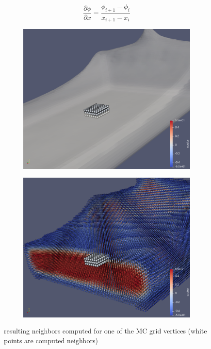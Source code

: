 \begin{equation}
	\dfrac{\partial \phi}{\partial x} = \dfrac{\phi_{i+1} - \phi_i}{x_{i+1} - x_i}
\end{equation}
\begin{figure}[H]
    \begin{subfigure}[b]{0.5\textwidth}
           \includegraphics[width=\textwidth]{figures/NeighborsComputation.png}
    \end{subfigure}
    \begin{subfigure}[b]{0.5\textwidth}
           \includegraphics[width=\textwidth]{figures/NeighborsComputation2.png}
    \end{subfigure}

    \caption{resulting neighbors computed for one of the MC grid vertices (white points are computed neighbors)}
    \label{fig:nghbrs_computation}
\end{figure}
